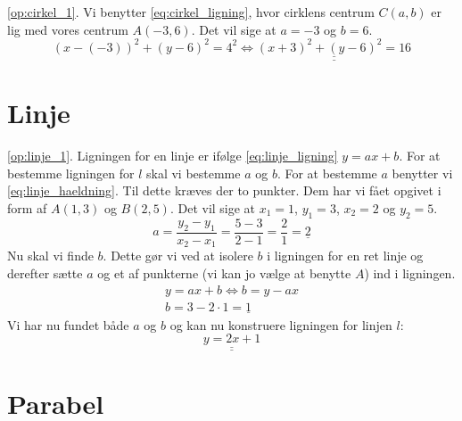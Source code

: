 \documentclass[11pt,a5paper,fleqn,leqno]{book}
\begin{document}
\ref{op:cirkel_1}. Vi benytter \eqref{eq:cirkel_ligning}, hvor cirklens centrum $C(a,b)$ er lig med vores centrum $A(-3,6)$. Det vil sige at $a = -3$ og $b = 6$.
\[(x-(-3))^2+(y-6)^2 = 4^2 \Leftrightarrow \underline{\underline{(x+3)^2+(y-6)^2 = 16}}\]

\section{Linje}

\ref{op:linje_1}. Ligningen for en linje er ifølge \eqref{eq:linje_ligning} $y = ax+b$. For at bestemme ligningen for $l$ skal vi bestemme $a$ og $b$. For at bestemme $a$ benytter vi \eqref{eq:linje_haeldning}. Til dette kræves der to punkter. Dem har vi fået opgivet i form af $A(1,3)$ og $B(2,5)$. Det vil sige at $x_1 = 1$, $y_1 = 3$, $x_2 = 2$ og $y_2 = 5$.
\[a = \dfrac{y_2 - y_1}{x_2 - x_1} = \dfrac{5-3}{2-1} = \dfrac{2}{1} = \underline{2}\]
Nu skal vi finde $b$. Dette gør vi ved at isolere $b$ i ligningen for en ret linje og derefter sætte $a$ og et af punkterne (vi kan jo vælge at benytte $A$) ind i ligningen.
\begin{displaymath}\begin{array}{l}
y = ax+b \Leftrightarrow b = y-ax \\
b = 3 - 2 \cdot 1 = \underline{1}
\end{array}\end{displaymath}
Vi har nu fundet både $a$ og $b$ og kan nu konstruere ligningen for linjen $l$:
\[\underline{\underline{y = 2x+1}}\]

\newpage

\section{Parabel}
\end{document}

